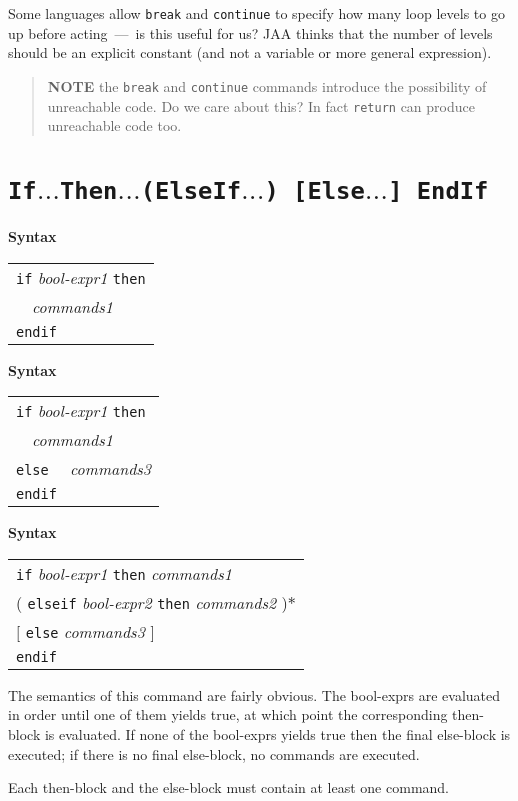 \documentclass{book}[12,a4paper]
\def\mydots{$...$}
\newenvironment{syntax}
{\goodbreak\noindent\textbf{Syntax}\\
 \begin{tabular}{|p{0.9\textwidth}|}\hline}
{\\\hline\end{tabular}}
\begin{document}
 Some languages allow \texttt{break} and \texttt{continue} to
specify how many loop levels to go up before acting~---~is this useful for
us?  JAA thinks that the number of levels should be an explicit constant
(and not a variable or more general expression).

\begin{quote}
  \textbf{NOTE} the \texttt{break} and \texttt{continue} commands
  introduce the possibility of unreachable code.  Do we care about
  this?  In fact \texttt{return} can produce unreachable code too.
\end{quote}

\section{\texttt{If\mydots Then\mydots (ElseIf\mydots) [Else\mydots] EndIf}}
\label{keyword:if}

\begin{syntax}
\texttt{if} \textit{bool-expr1} \texttt{then}\\
\ \ \textit{commands1}\\
\texttt{endif}
\end{syntax}

\begin{syntax}
\texttt{if} \textit{bool-expr1} \texttt{then}\\
\ \ \textit{commands1}\\
\texttt{else}
\ \ \textit{commands3}\\
\texttt{endif}
\end{syntax}

\begin{syntax}
\texttt{if} \textit{bool-expr1} \texttt{then} \textit{commands1}\\
( \texttt{elseif} \textit{bool-expr2} \texttt{then} \textit{commands2} )$*$\\
$[$ \texttt{else} \textit{commands3} $]$\\
\texttt{endif}
\end{syntax}

The semantics of this command are fairly obvious.  The bool-exprs are
evaluated in order until one of them yields true, at which point the
corresponding then-block is evaluated.  If none of the bool-exprs yields
true then the final else-block is executed; if there is no final
else-block, no commands are executed.

Each then-block and the else-block must contain at least one command.
\end{document}
